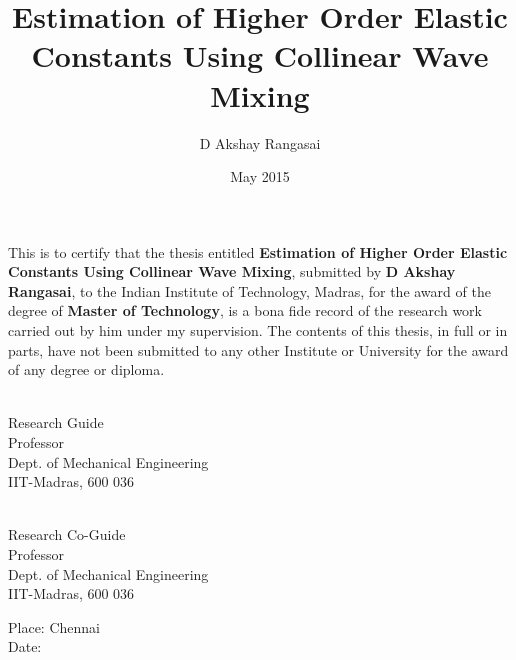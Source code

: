 \documentclass[MTech]{iitmdiss}
\def\thesistitle{Estimation of Higher Order Elastic Constants
Using Collinear Wave Mixing}
\def\thesisauthor{D Akshay Rangasai}
\begin{document}


\title{Estimation of Higher Order Elastic Constants
Using Collinear Wave Mixing}

\author{D Akshay Rangasai}

\date{May 2015}

\begin{singlespace}
\maketitle 
\end{singlespace} 

\certificate

\vspace*{0.5in}

\noindent This is to certify that the thesis entitled {\bf {\thesistitle}}, 
submitted by {\bf {\thesisauthor}}, to the Indian Institute of Technology, 
Madras, for the award of the degree of {\bf Master of Technology}, 
is a bona fide record of the research work carried out by him under my
supervision. The contents of this thesis, in full or in parts, have not been
submitted to any other Institute or University for the award of any degree or
diploma.

\vspace*{1.4in}
\hspace*{-0.25in}
\begin{minipage}{0.5\textwidth}
\begin{singlespace}
 \\
\noindent Research Guide \\ 
\noindent Professor \\
\noindent Dept. of Mechanical Engineering\\
\noindent IIT-Madras, 600 036 \\
\end{singlespace}
\end{minipage}
\begin{minipage}{0.5\textwidth}
\begin{singlespace}
 \\
\noindent Research Co-Guide \\ 
\noindent Professor \\
\noindent Dept. of Mechanical Engineering\\
\noindent IIT-Madras, 600 036 \\
\end{singlespace}
\end{minipage}
\vspace*{0.20in}
\noindent Place: Chennai\\ 
Date:
\end{document}
